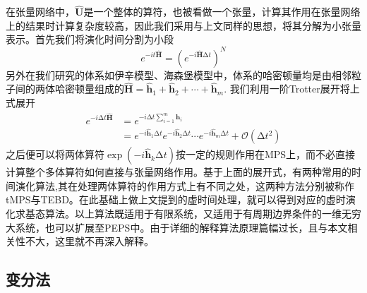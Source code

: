 在张量网络中，$\hat{\symbf{U}}$是一个整体的算符，也被看做一个张量，计算其作用在张量网络上的结果时计算复杂度较高，因此我们采用与上文同样的思想，将其分解为小张量表示。首先我们将演化时间分割为小段
\begin{equation}
e^{-it\hat{\symbf{H}}} = \left(e^{-i\hat{\symbf{H}}\increment t}\right)^N
\end{equation}
另外在我们研究的体系如伊辛模型、海森堡模型中，体系的哈密顿量均是由相邻粒子间的两体哈密顿量组成的$\hat{\symbf{H}}=\hat{\symbf{h}}_1 + \hat{\symbf{h}}_2 + \cdots+ \hat{\symbf{h}}_m$. 我们利用一阶Trotter展开将上式展开
\begin{align}
	e^{-i\increment t \hat{\symbf{H}}} &= e^{-i\increment t \sum_{i=1}^m \hat{\symbf{h}}_i}\\
			&= e^{-i\hat{\symbf{h}}_1\increment t}e^{-i\hat{\symbf{h}}_2\increment t}\cdots e^{-i\hat{\symbf{h}}_m\increment t} + \mathcal{O}(\increment t^2)
\end{align}
之后便可以将两体算符$\exp(-i\hat{\symbf{h}}_k\increment t)$按一定的规则作用在MPS上，而不必直接计算整个多体算符如何直接与张量网络作用。基于上面的展开式，有两种常用的时间演化算法,其在处理两体算符的作用方式上有不同之处，这两种方法分别被称作tMPS\cite[75]{schollwoeckDensitymatrixRenormalizationGroup2011}与TEBD\cite{vidalClassicalSimulationInfiniteSize2007}。在此基础上做上文提到的虚时间处理，就可以得到对应的虚时演化求基态算法。以上算法既适用于有限系统，又适用于有周期边界条件的一维无穷大系统，也可以扩展至PEPS中。由于详细的解释算法原理篇幅过长，且与本文相关性不大，这里就不再深入解释。

\subsection{变分法}

